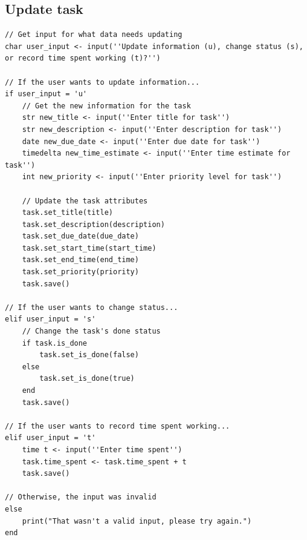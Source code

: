 \documentclass{article}
\begin{document}
\subsection{Update task}
\begin{lstlisting}[breaklines]
// Get input for what data needs updating
char user_input <- input(''Update information (u), change status (s), or record time spent working (t)?'')

// If the user wants to update information...
if user_input = 'u'
    // Get the new information for the task
    str new_title <- input(''Enter title for task'')
    str new_description <- input(''Enter description for task'')
    date new_due_date <- input(''Enter due date for task'')
    timedelta new_time_estimate <- input(''Enter time estimate for task'')
    int new_priority <- input(''Enter priority level for task'')

    // Update the task attributes
    task.set_title(title)
    task.set_description(description)
    task.set_due_date(due_date)
    task.set_start_time(start_time)
    task.set_end_time(end_time)
    task.set_priority(priority)
    task.save()

// If the user wants to change status...
elif user_input = 's'
    // Change the task's done status
    if task.is_done
        task.set_is_done(false)
    else
        task.set_is_done(true)
    end
    task.save()

// If the user wants to record time spent working...
elif user_input = 't'
    time t <- input(''Enter time spent'')
    task.time_spent <- task.time_spent + t
    task.save()

// Otherwise, the input was invalid
else
    print("That wasn't a valid input, please try again.")
end
\end{lstlisting}
\end{document}
